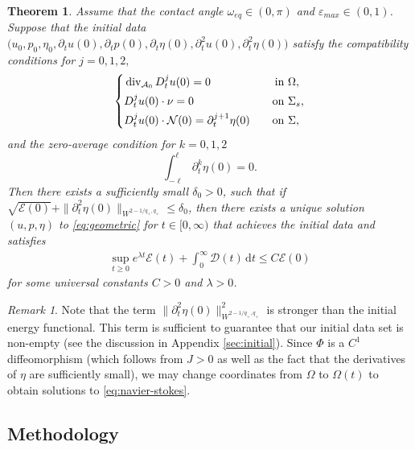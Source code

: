 \documentclass[letterpaper,reqno,10pt,twoside]{amsart}
\newtheorem{theorem}{Theorem}[section]
\theoremstyle{definition}
\theoremstyle{remark}
\newtheorem{remark}{Remark}[section]
\def\p{\partial}
\def\Om{\Omega}
\def\om{\omega}
\def\dive{\mathop{\rm div}\nolimits}
\begin{document}
	\begin{theorem}\label{thm:main}
		Assume that the contact angle $\om_{eq} \in (0, \pi)$ and $\varepsilon_{max} \in (0, 1)$.
		Suppose that the initial data $\Big(u_0, p_0, \eta_0, \p_tu(0), \p_tp(0), \p_t\eta(0), \p_t^2u(0),\p_t^2\eta(0)\Big)$ satisfy the compatibility conditions for $j=0,1,2,$
		\begin{equation}\label{compat_C2}
			\left\{
			\begin{aligned}
				&\dive_{\mathcal{A}_0}D_t^ju(0)=0\quad &\text{in}&\ \Om,\\
				&D_t^ju(0)\cdot\nu=0\quad &\text{on}&\ \Sigma_s,\\
				&D_t^ju(0)\cdot\mathcal{N}(0)=\p_t^{j+1}\eta(0)\quad &\text{on}&\ \Sigma,
			\end{aligned}
			\right.
		\end{equation}
		and the zero-average condition for $k=0, 1, 2$
		\begin{equation}\label{cond:zero}
			\int_{-\ell}^\ell\p_t^k\eta(0)=0.
		\end{equation}
		Then there exists a sufficiently small $\delta_0>0$, such that if $\sqrt{\mathcal{E}(0)} + \|\p_t^2 \eta(0)\|_{W^{2-1/q_+, q_+}} \le \delta_0$, then there exists a unique solution $(u,p,\eta)$ to \eqref{eq:geometric} for $t\in[0,\infty)$ that achieves the initial data and satisfies
		\begin{equation}
			\begin{aligned}
				\sup_{t\ge 0}e^{\lambda t}\mathcal{E}(t)+\int_0^\infty\mathcal{D}(t)\,\mathrm{d}t\le C\mathcal{E}(0)
			\end{aligned}
		\end{equation}
		for some universal constants $C>0$ and $\lambda>0$.
	\end{theorem}
	
	\begin{remark}
		Note that the term $\|\p_t^2\eta(0)\|_{W^{2-1/q_+, q_+}}^2$ is stronger than the initial energy functional. This term is sufficient to guarantee that our initial data set is non-empty (see the discussion in Appendix \ref{sec:initial}). Since $\Phi$ is a $C^1$ diffeomorphism (which follows from $J>0$ as well as the fact that the derivatives of $\eta$ are sufficiently small), we may change coordinates from $\Om$ to $\Om(t)$ to obtain solutions to \eqref{eq:navier-stokes}.
	\end{remark}
	
	
	\subsection{Methodology}\label{section:discussion}
	
\end{document}
